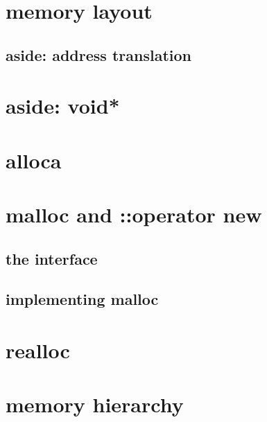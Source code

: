 
\begin{frame}
    \titlepage
\end{frame}

\section{memory layout}




\subsection{aside: address translation}


\section{aside: void*}



\section{alloca}



\section{malloc and ::operator new}

\subsection{the interface}



%

\subsection{implementing malloc}



\section{realloc}



\section{memory hierarchy}

